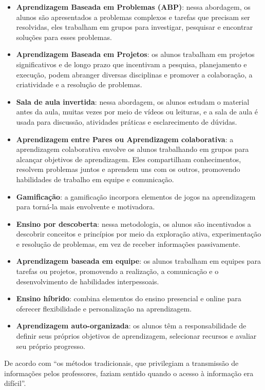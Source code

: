 \begin{itemize}
    \item \textbf{Aprendizagem Baseada em Problemas (ABP)}: nessa abordagem, os alunos são apresentados a problemas complexos e tarefas que precisam ser resolvidas, eles trabalham em grupos para investigar, pesquisar e encontrar soluções para esses problemas.
    \item \textbf{Aprendizagem Baseada em Projetos}: os alunos trabalham em projetos significativos e de longo prazo que incentivam a pesquisa, planejamento e execução, podem abranger diversas disciplinas e promover a colaboração, a criatividade e a resolução de problemas.
    \item \textbf{Sala de aula invertida}: nessa abordagem, os alunos estudam o material antes da aula, muitas vezes por meio de vídeos ou leituras, e a sala de aula é usada para discussão, atividades práticas e esclarecimento de dúvidas.
    \item \textbf{Aprendizagem entre Pares ou Aprendizagem colaborativa}: a aprendizagem colaborativa envolve os alunos trabalhando em grupos para alcançar objetivos de aprendizagem. Eles compartilham conhecimentos, resolvem problemas juntos e aprendem uns com os outros, promovendo habilidades de trabalho em equipe e comunicação.
    \item \textbf{Gamificação}: a gamificação incorpora elementos de jogos na aprendizagem para torná-la mais envolvente e motivadora.
    \item \textbf{Ensino por descoberta}: nessa metodologia, os alunos são incentivados a descobrir conceitos e princípios por meio da exploração ativa, experimentação e resolução de problemas, em vez de receber informações passivamente.
    \item \textbf{Aprendizagem baseada em equipe}: os alunos trabalham em equipes para tarefas ou projetos, promovendo a realização, a comunicação e o desenvolvimento de habilidades interpessoais.
    \item \textbf{Ensino híbrido}: combina elementos do ensino presencial e online para oferecer flexibilidade e personalização na aprendizagem.
    \item \textbf{Aprendizagem auto-organizada}: os alunos têm a responsabilidade de definir seus próprios objetivos de aprendizagem, selecionar recursos e avaliar seu próprio progresso.
\end{itemize}

De acordo com  ``os métodos tradicionais, que privilegiam a transmissão de informações pelos professores, faziam sentido quando o acesso à informação era difícil''.

